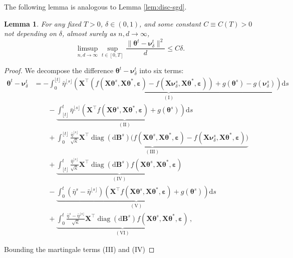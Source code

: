 \documentclass[11pt,letterpaper,reqno]{amsart}
\makeatletter
\def\paragraph{\@startsection{paragraph}{4}%
  \z@\z@{-\fontdimen2\font}%
  {\normalfont\bfseries}}
\newtheorem{lem}[thm]{Lemma}
\theoremstyle{definition}
\def\eps{\varepsilon}
\def\d{\mathrm{d}}
\def\diag{\operatorname{diag}}
\def\B{\mathbf{B}}
\def\X{\mathbf{X}}
\def\beps{\boldsymbol{\varepsilon}}
\def\btheta{\boldsymbol{\theta}}
\def\bnu{\boldsymbol{\nu}}
\newcommand{\flr}[1]{{\lfloor {#1} \rfloor}}
\newcommand{\norm}[1]{\|#1\|}
\newcommand{\prn}[1]{\left({#1}\right)} %
\makeatother
\begin{document}
The following lemma is analogous to Lemma \ref{lem:disc-sgd}.

\begin{lem}\label{lem:disc-sme}
For any fixed $T>0$, $\delta \in (0,1)$, and some constant $C \equiv
C(T)>0$ not depending on $\delta$, almost surely as $n,d \to \infty$,
\begin{equation}
\limsup_{n,d\to \infty} \sup_{t\in[0,T]}
\frac{\norm{\btheta^t-\bnu_\delta^t}^2}{d} \leq C\delta.
\end{equation}
\end{lem}

\begin{proof}
We decompose the difference $\btheta^t - \bnu_\delta^t$ into six terms:
\begin{align*}
\btheta^t - \bnu_\delta^t
&=-\underbrace{\int_0^{\flr{t}}\bar\eta^{\flr{s}} \prn{\X^\top
(f(\X\btheta^s,\X\btheta^*,\beps)-f(\X\bnu_\delta^s,\X\btheta^*,\beps)) +
g(\btheta^s)-g(\bnu_\delta^s)} \d s}_{(\mathrm{I})}\\
&\qquad- \underbrace{\int_{\flr{t}}^t \bar\eta^{\flr{s}} \prn{\X^\top
f(\X\btheta^s,\X\btheta^*,\beps) + g(\btheta^s)} \d s}_{(\mathrm{II})}  \nonumber\\
&\qquad+ \underbrace{\int_0^{\flr{t}}\frac{\bar\eta^{\flr{s}}}{\sqrt{\bar \kappa}} \X^\top
\diag(\d\B^s)\big(f(\X\btheta^s,\X\btheta^*,\beps)-f(\X\bnu_\delta^s,\X\btheta^*,\beps)\big)}_{(\mathrm{III})}\\
&\qquad+ \underbrace{\int_{\flr{t}}^t\frac{\bar\eta^{\flr{s}}}{\sqrt{\bar \kappa}} \X^\top
\diag(\d\B^s)f(\X\btheta^s,\X\btheta^*,\beps)}_{(\mathrm{IV})}\\
&\qquad- \underbrace{\int_0^t \prn{\bar\eta^{{s}} - \bar\eta^{\flr{s}}} \prn{\X^\top
f(\X\btheta^s,\X\btheta^*,\beps) + g(\btheta^s)} \d s}_{\mathrm{(V)}}\\
&\qquad+ \underbrace{\int_0^t
\frac{\bar\eta^{{s}} - \bar\eta^{\flr{s}}}{\sqrt{\bar \kappa}} \X^\top
\diag(\d\B^s) f(\X\btheta^s,\X\btheta^*,\beps)}_{\mathrm{(VI)}}\, ,
\end{align*}

\paragraph{Bounding the martingale terms (III) and (IV)}


\end{proof}
\end{document}
